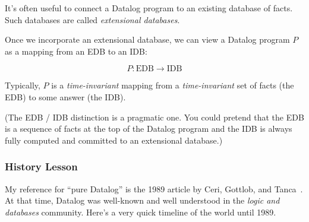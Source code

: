 \documentclass{article}
\begin{document}
It's often useful to connect a Datalog program to an existing database of facts.
Such databases are called \emph{extensional databases}.

Once we incorporate an extensional database, we can view a Datalog program $P$ as a mapping from an EDB to an IDB:

\[ P : \mbox{EDB} \rightarrow \mbox{IDB} \]

Typically, $P$ is a \emph{time-invariant} mapping from a \emph{time-invariant} set of facts (the EDB) to some answer (the IDB).

(The EDB / IDB distinction is a pragmatic one. You could pretend that the EDB is a sequence of facts at the top of the Datalog program and the IDB is always fully computed and committed to an extensional database.)


\subsubsection*{History Lesson}

My reference for ``pure Datalog'' is the 1989 article by Ceri, Gottlob, and Tanca~\cite{cgt-ieee-1989}.
At that time, Datalog was well-known and well understood in the \emph{logic and databases} community.
Here's a very quick timeline of the world until 1989.
\end{document}
